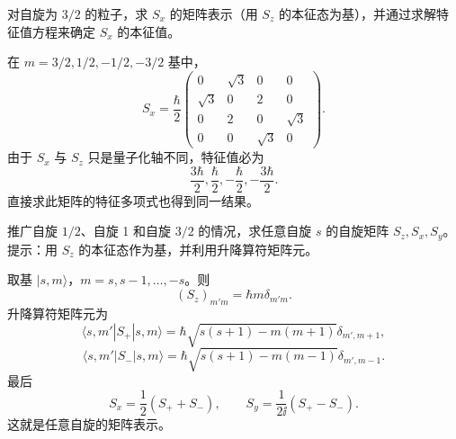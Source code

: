 \begin{question}
对自旋为 $3/2$ 的粒子，求 $S_x$ 的矩阵表示（用 $S_z$ 的本征态为基），并通过求解特征值方程来确定 $S_x$ 的本征值。
\end{question}
\begin{solution}

在 $m=3/2,1/2,-1/2,-3/2$ 基中，
\[
S_x=\frac{\hbar}{2}\begin{pmatrix}
0&\sqrt3&0&0\\
\sqrt3&0&2&0\\
0&2&0&\sqrt3\\
0&0&\sqrt3&0
\end{pmatrix}.
\]
由于 $S_x$ 与 $S_z$ 只是量子化轴不同，特征值必为
\[
\frac{3\hbar}{2},\frac{\hbar}{2},-\frac{\hbar}{2},-\frac{3\hbar}{2}.
\]
直接求此矩阵的特征多项式也得到同一结果。

\end{solution}

\begin{question}
推广自旋 $1/2$、自旋 1 和自旋 $3/2$ 的情况，求任意自旋 $s$ 的自旋矩阵 $S_z,S_x,S_y$。提示：用 $S_z$ 的本征态作为基，并利用升降算符矩阵元。
\end{question}
\begin{solution}

取基 $|s,m\rangle$，$m=s,s-1,\ldots,-s$。则
\[
(S_z)_{m'm}=\hbar m\delta_{m'm}.
\]
升降算符矩阵元为
\[
\langle s,m'|S_+|s,m\rangle=
\hbar\sqrt{s(s+1)-m(m+1)}\delta_{m',m+1},
\]
\[
\langle s,m'|S_-|s,m\rangle=
\hbar\sqrt{s(s+1)-m(m-1)}\delta_{m',m-1}.
\]
最后
\[
S_x=\frac12(S_++S_-),
\qquad
S_y=\frac{1}{2\ii}(S_+-S_-).
\]
这就是任意自旋的矩阵表示。

\end{solution}


